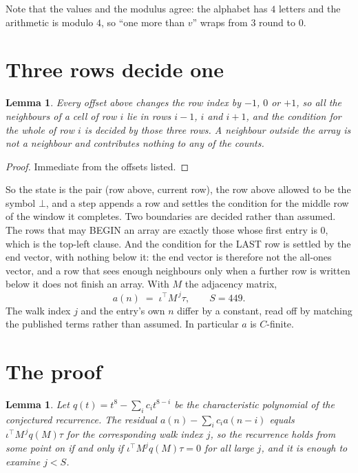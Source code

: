 \documentclass[11pt,a4paper]{article}
\theoremstyle{plain}
\newtheorem{lemma}[theorem]{Lemma}
\theoremstyle{definition}
\begin{document}
Note that the values and the modulus agree: the alphabet has $4$ letters and the arithmetic
is modulo $4$, so ``one more than $v$'' wraps from $3$ round to $0$.

\section{Three rows decide one}

\begin{lemma}\label{lem:win}
Every offset above changes the row index by $-1$, $0$ or $+1$, so all the neighbours of a cell
of row $i$ lie in rows $i-1$, $i$ and $i+1$, and the condition for the whole of row $i$ is
decided by those three rows. A neighbour outside the array is not a neighbour and contributes
nothing to any of the counts.
\end{lemma}

\begin{proof}
Immediate from the offsets listed.
\end{proof}

So the state is the pair (row above, current row), the row above allowed to be the symbol
$\bot$, and a step appends a row and settles the condition for the middle row of the window it
completes. Two boundaries are decided rather than assumed. The rows that may BEGIN an array are
exactly those whose first entry is $0$, which is the top-left clause. And the condition for the
LAST row is settled by the end vector, with nothing below it: the end vector is therefore not
the all-ones vector, and a row that sees enough neighbours only when a further row is written
below it does not finish an array. With $M$ the adjacency matrix,
\[
a(n)\;=\;\iota^{\!\top}M^{\,j}\tau ,\qquad S=449.
\]
The walk index $j$ and the entry's own $n$ differ by a constant, read off by matching the
published terms rather than assumed. In particular $a$ is $C$-finite.

\section{The proof}

\begin{lemma}\label{lem:crit}
Let $q(t)=t^{8}-\sum_i c_it^{8-i}$ be the characteristic polynomial of the
conjectured recurrence. The residual $a(n)-\sum_ic_ia(n-i)$ equals
$\iota^{\!\top}M^{\,j}q(M)\tau$ for the corresponding walk index $j$, so the recurrence
holds from some point on if and only if $\iota^{\!\top}M^{j}q(M)\tau=0$ for all large $j$,
and it is enough to examine $j<S$.
\end{lemma}
\end{document}
